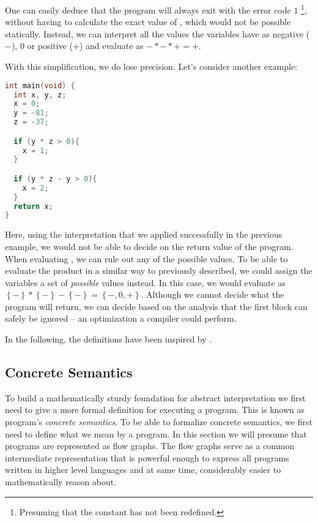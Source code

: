 \documentclass[..thesis.tex]{subfiles}
\begin{document}
One can easily deduce that the program will always exit with the error code $1$ \footnote{Presuming that the constant  has not been redefined.},
without having to calculate the exact value of  , which would not be possible statically.
Instead, we can interpret all the values the variables have as negative ($-$), $0$ or positive ($+$) and evaluate   as $-*-*+ = +$.

With this simplification, we do lose precision. Let's consider another example:

\begin{lstlisting}[language=C,style=def]
int main(void) {
  int x, y, z;
  x = 0;
  y = -81;
  z = -37;

  if (y * z > 0){
    x = 1;
  }

  if (y * z - y > 0){
    x = 2;
  }
  return x;
}
\end{lstlisting}

Here, using the interpretation that we applied successfully in the previous example, we would not be able to decide on the return value of the program. 
When evaluating , we can rule out any of the possible values. To be able to evaluate the product in a similar way to previously described,
we could assign the variables a set of \textit{possible} values instead. In this case, we would evaluate  as $\left\lbrace - \right\rbrace * \left\lbrace
- \right\rbrace - \left\lbrace - \right\rbrace = \left\lbrace -,0,+ \right\rbrace$. Although we cannot decide what the program will return,
we can decide based on the analysis that the first  block can safely be ignored -- an optimization a compiler could perform.

In the following, the definitions have been inspired by \cite{vojdanivesal_static_2010, apinis_frameworks_2014}.

\subsection{Concrete Semantics}

To build a mathematically sturdy foundation for abstract interpretation we first need to give a more formal definition for executing a program.
This is known as program's \emph{concrete semantics}.
To be able to formalize concrete semantics, we first need to define what we mean by a program. In this section we will presume that programs are represented as flow graphs.
The flow graphs serve as a common intermediate representation that is powerful enough to express all programs written in higher level languages and at same time,
considerably easier to mathematically reason about.
\end{document}
